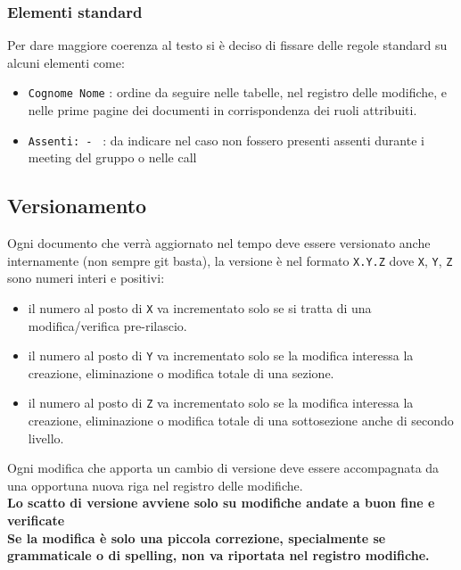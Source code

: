 \subsubsection{Elementi standard}
Per dare maggiore coerenza al testo si è deciso di fissare delle regole standard su alcuni elementi come:
\begin{itemize}
	\item \texttt{Cognome Nome} : ordine da seguire nelle tabelle, nel registro delle modifiche, e nelle prime pagine dei documenti in corrispondenza dei ruoli attribuiti.
	\item \texttt{Assenti: - } : da indicare nel caso non fossero presenti assenti durante i meeting del gruppo o nelle call
\end{itemize}

\subsection{Versionamento}
Ogni documento che verrà aggiornato nel tempo deve essere versionato anche
internamente (non sempre git basta), la versione è nel formato \texttt{X.Y.Z} dove
\texttt{X}, \texttt{Y}, \texttt{Z} sono numeri interi e positivi:
\begin{itemize}
    \item il numero al posto di \texttt{X} va incrementato solo se si tratta di una
    modifica/verifica pre-rilascio.
    \item il numero al posto di \texttt{Y} va incrementato solo se la modifica
    interessa la creazione, eliminazione o modifica totale di una sezione.
    \item il numero al posto di \texttt{Z} va incrementato solo se la modifica
    interessa la creazione, eliminazione o modifica totale di una sottosezione
    anche di secondo livello.
\end{itemize}
Ogni modifica che apporta un cambio di versione deve essere accompagnata da una
opportuna nuova riga nel registro delle modifiche.
\\

\noindent
\textbf{Lo scatto di versione avviene solo su modifiche andate a buon fine e verificate}
\\

\noindent
\textbf{Se la modifica è solo una piccola correzione, specialmente se grammaticale o di
spelling, non va riportata nel registro modifiche.}

